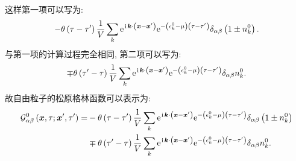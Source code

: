 这样第一项可以写为:
\begin{equation}
-\theta\left(\tau-\tau^{\prime}\right) \frac{1}{V} \sum_k \mathrm{e}^{\hspace{0.1em}\mathrm{i}\hspace{0.1em} \boldsymbol{k} \cdot\left(\boldsymbol{x}-\boldsymbol{x}^{\prime}\right)} \mathrm{e}^{-\left(\epsilon_k^0-\mu\right)\left(\tau-\tau^{\prime}\right)} \delta_{\alpha \beta}\left(1 \pm n_k^0\right).
\end{equation}
与第一项的计算过程完全相同, 第二项可以写为:
\begin{equation}
\mp \theta\left(\tau^{\prime}-\tau\right) \frac{1}{V} \sum_k \mathrm{e}^{\hspace{0.1em}\mathrm{i}\hspace{0.1em} \boldsymbol{k} \cdot\left(\boldsymbol{x}-\boldsymbol{x}^{\prime}\right)} \mathrm{e}^{-\left(\epsilon_k^0-\mu\right)\left(\tau-\tau^{\prime}\right)} \delta_{\alpha \beta} n_k^0.
\end{equation}
故自由粒子的松原格林函数可以表示为:
\begin{align}
\mathcal{G}_{\alpha \beta}^0\left(\boldsymbol{x}, \tau ; \boldsymbol{x}^{\prime}, \tau^{\prime}\right)=& -\theta\left(\tau-\tau^{\prime}\right) \frac{1}{V} \sum_k \mathrm{e}^{\hspace{0.1em}\mathrm{i}\hspace{0.1em} \boldsymbol{k} \cdot\left(\boldsymbol{x}-\boldsymbol{x}^{\prime}\right)} \mathrm{e}^{-\left(\epsilon_k^0-\mu\right)\left(\tau-\tau^{\prime}\right)} \delta_{\alpha \beta}\left(1 \pm n_k^0\right) \nonumber\\
& \mp \theta\left(\tau^{\prime}-\tau\right) \frac{1}{V} \sum_k \mathrm{e}^{\hspace{0.1em}\mathrm{i}\hspace{0.1em} \boldsymbol{k} \cdot\left(\boldsymbol{x}-\boldsymbol{x}^{\prime}\right)} \mathrm{e}^{-\left(\epsilon_k^0-\mu\right)\left(\tau-\tau^{\prime}\right)} \delta_{\alpha \beta} n_k^0 .
\end{align}

